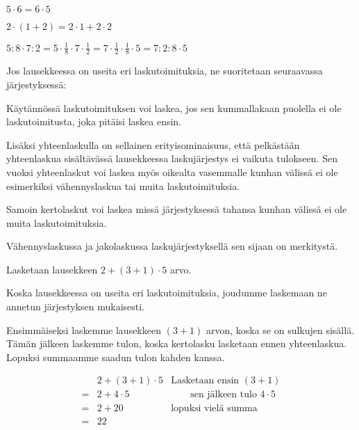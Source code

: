 \begin{esimerkki}

$5 \cdot 6 = 6 \cdot 5$
 
 $2 \cdot (1+2) = 2 \cdot 1 + 2 \cdot 2$
\end{esimerkki} 



\begin{esimerkki}
$5:8\cdot 7:2=5\cdot\frac18\cdot 7\cdot\frac12=7\cdot \frac12\cdot\frac18\cdot 5=7:2:8\cdot 5$
\end{esimerkki} 

Jos lausekkeessa on useita eri laskutoimituksia, ne suoritetaan seuraavassa järjestyksessä:


Käytännössä laskutoimituksen voi laskea, jos sen kummallakaan puolella ei ole laskutoimitusta, joka pitäisi laskea ensin.



Lisäksi yhteenlaskulla on sellainen erityisominaisuus, että pelkästään yhteenlaskua sisältävässä
lausekkeessa laskujärjestys ei vaikuta tulokseen. Sen vuoksi yhteenlaskut voi laskea myös oikealta
vasemmalle kunhan välissä ei ole esimerkiksi vähennyslaskua tai muita laskutoimituksia.

Samoin kertolaskut voi laskea missä järjestyksessä tahansa kunhan välissä ei ole muita laskutoimituksia.

Vähennyslaskussa ja jakolaskussa laskujärjestyksellä sen sijaan on merkitystä.

\begin{esimerkki}
Lasketaan lausekkeen $2+(3+1)\cdot 5$ arvo.

Koska lausekkeessa on useita eri laskutoimituksia, joudumme laskemaan ne annetun järjestyksen mukaisesti.

Ensimmäiseksi laskemme lausekkeen $(3+1)$ arvon, koska se on sulkujen sisällä. Tämän jälkeen laskemme tulon, koska kertolasku lasketaan ennen yhteenlaskua. Lopuksi summaamme saadun tulon kahden kanssa.

\begin{align*}
   &2+(3+1)\cdot 5&\textrm{Lasketaan ensin } (3+1)
\\= &2+4\cdot5&\qquad\textrm{sen jälkeen tulo } 4\cdot 5 
\\= &2+20& \textrm{lopuksi vielä summa}
\\= &22&
\end{align*}
\end{esimerkki}

